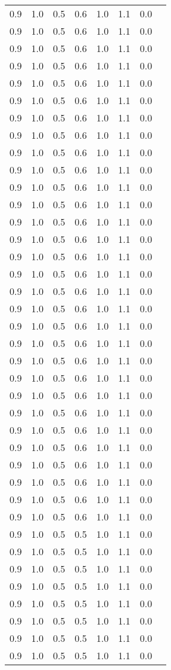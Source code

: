 \begin{tabular}{L{1in}|L{1in}|L{1in}|L{1in}|L{1in}|L{1in}|L{1in}|L{1in}}
0.9&1.0&0.5&0.6&1.0&1.1&0.0\\
0.9&1.0&0.5&0.6&1.0&1.1&0.0\\
0.9&1.0&0.5&0.6&1.0&1.1&0.0\\
0.9&1.0&0.5&0.6&1.0&1.1&0.0\\
0.9&1.0&0.5&0.6&1.0&1.1&0.0\\
0.9&1.0&0.5&0.6&1.0&1.1&0.0\\
0.9&1.0&0.5&0.6&1.0&1.1&0.0\\
0.9&1.0&0.5&0.6&1.0&1.1&0.0\\
0.9&1.0&0.5&0.6&1.0&1.1&0.0\\
0.9&1.0&0.5&0.6&1.0&1.1&0.0\\
0.9&1.0&0.5&0.6&1.0&1.1&0.0\\
0.9&1.0&0.5&0.6&1.0&1.1&0.0\\
0.9&1.0&0.5&0.6&1.0&1.1&0.0\\
0.9&1.0&0.5&0.6&1.0&1.1&0.0\\
0.9&1.0&0.5&0.6&1.0&1.1&0.0\\
0.9&1.0&0.5&0.6&1.0&1.1&0.0\\
0.9&1.0&0.5&0.6&1.0&1.1&0.0\\
0.9&1.0&0.5&0.6&1.0&1.1&0.0\\
0.9&1.0&0.5&0.6&1.0&1.1&0.0\\
0.9&1.0&0.5&0.6&1.0&1.1&0.0\\
0.9&1.0&0.5&0.6&1.0&1.1&0.0\\
0.9&1.0&0.5&0.6&1.0&1.1&0.0\\
0.9&1.0&0.5&0.6&1.0&1.1&0.0\\
0.9&1.0&0.5&0.6&1.0&1.1&0.0\\
0.9&1.0&0.5&0.6&1.0&1.1&0.0\\
0.9&1.0&0.5&0.6&1.0&1.1&0.0\\
0.9&1.0&0.5&0.6&1.0&1.1&0.0\\
0.9&1.0&0.5&0.6&1.0&1.1&0.0\\
0.9&1.0&0.5&0.6&1.0&1.1&0.0\\
0.9&1.0&0.5&0.6&1.0&1.1&0.0\\
0.9&1.0&0.5&0.5&1.0&1.1&0.0\\
0.9&1.0&0.5&0.5&1.0&1.1&0.0\\
0.9&1.0&0.5&0.5&1.0&1.1&0.0\\
0.9&1.0&0.5&0.5&1.0&1.1&0.0\\
0.9&1.0&0.5&0.5&1.0&1.1&0.0\\
0.9&1.0&0.5&0.5&1.0&1.1&0.0\\
0.9&1.0&0.5&0.5&1.0&1.1&0.0\\
0.9&1.0&0.5&0.5&1.0&1.1&0.0\\

\end{tabular}
